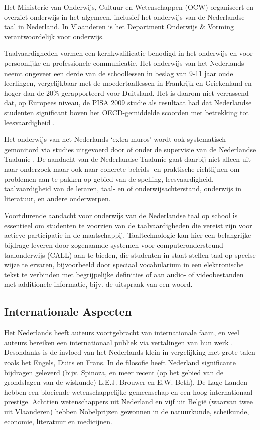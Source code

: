 \documentclass[]{../../metanetpaper}
\begin{document}
\begin{multicols}{2}
    Het Ministerie van Onderwijs, Cultuur en Wetenschappen (OCW) organiseert en overziet onderwijs in het algemeen, inclusief het onderwijs van de Nederlandse taal in Nederland. In Vlaanderen is het Department Onderwijs \& Vorming verantwoordelijk voor onderwijs.

    Taalvaardigheden vormen een kernkwalificatie benodigd in het onderwijs en voor persoonlijke en professionele communicatie. Het onderwijs van het Nederlands neemt ongeveer een derde van de schoollessen in beslag van 9-11 jaar oude leerlingen, vergelijkbaar met de moedertaallessen in Frankrijk en Griekenland en hoger dan de 20\% gerapporteerd voor Duitsland. Het is daarom niet verrassend dat, op Europees niveau, de PISA 2009 studie als resultaat had dat Nederlandse studenten significant boven het OECD-gemiddelde scoorden met betrekking tot leesvaardigheid \cite{Dataoecd}.

    Het onderwijs van het Nederlands `extra muros' wordt ook systematisch gemonitord via studies uitgevoerd door of onder de supervisie van de Nederlandse Taalunie \cite{NTUOnderwijs}.  De aandacht van de Nederlandse Taalunie gaat daarbij niet alleen uit naar onderzoek maar ook naar concrete beleids- en praktische richtlijnen om problemen aan te pakken op gebied van de spelling, leesvaardigheid, taalvaardigheid van de leraren, taal- en of onderwijsachterstand, onderwijs in literatuur, en andere onderwerpen.

    Voortdurende aandacht voor onderwijs van de Nederlandse taal op school is essentieel om studenten te voorzien van de taalvaardigheden die vereist zijn voor actieve participatie in de maatschappij. Taaltechnologie kan hier een belangrijke bijdrage leveren door zogenaamde systemen voor computerondersteund taalonderwijs (CALL) aan te bieden, die studenten in staat stellen taal op speelse wijze te ervaren, bijvoorbeeld door speciaal vocabularium in een elektronische tekst te verbinden met begrijpelijke definities of aan audio- of videobestanden met additionele informatie, bijv. de uitspraak van een woord.

\subsection{Internationale Aspecten}

    Het Nederlands heeft auteurs voortgebracht van internationale faam, en veel auteurs bereiken een internationaal publiek via vertalingen van hun werk \cite{Vertalingendb}.   Desondanks is de invloed van het Nederlands klein in vergelijking met grote talen zoals het Engels, Duits en Frans. In de filosofie heeft Nederland significante bijdragen geleverd (bijv. Spinoza, en meer recent (op het gebied van de grondslagen van de wiskunde) L.E.J. Brouwer en E.W. Beth). De Lage Landen hebben een bloeiende wetenschappelijke gemeenschap en een hoog internationaal prestige. Achttien wetenschappers uit Nederland en vijf uit Belgi{\"e} (waarvan twee uit Vlaanderen) hebben Nobelprijzen gewonnen in de natuurkunde, scheikunde, economie, literatuur en medicijnen.


\end{multicols}
\end{document}
